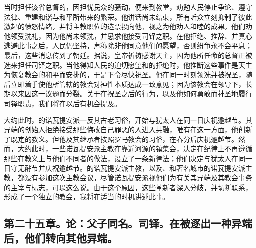 当时担任该省总督的，因担忧民众的骚动，便来到教堂，劝勉人民停止争论、遵守法律、重建和谐与和平所带来的繁荣。他讲话尚未结束，所有听众立刻抑制了彼此激起的愤怒情绪，并将主教职位的选票投向他，视之为他劝人和睦的成果。他们劝他领受洗礼，因为他尚未领洗，并恳求他接受司铎之职。在他拒绝、推辞、并真心逃避此事之后，人民仍坚持，声称除非他同意他们的愿望，否则纷争永不会平息；最后，这些消息传到了朝廷。据说，皇帝祈祷感谢天主，因为他所任命的总督正被选来担任司铎之职。当他得知人民的迫切愿望和的拒绝时，他推断这些事件是天主为恢复教会的和平而安排的，于是下令尽快祝圣。他在同一时刻领洗并被祝圣，随后立即着手使他所管辖的教会对神性本质达成一致意见；因为该教会在领导下，长期以来因这一议题而分裂。关于在祝圣之后的行为，以及他如何勇敢而神圣地履行司铎职责，我们将在以后有机会提及。\par

大约此时，的诺瓦提安派一反其古老习俗，开始与犹太人在同一日庆祝逾越节。其异端的创始人拒绝接受那些悔改自己罪恶的人进入共融，唯有在这一方面，他创新了既定的教义。但他及其继承者按照罗马教会的习俗，在春分后庆祝逾越节。然而，大约此时，一些诺瓦提安派主教在靠近河源的镇集会，决定在纪律上不再遵循那些在教义上与他们不同者的做法，设立了一条新律法；他们决定与犹太人在同一日守无酵节并庆祝逾越节。的诺瓦提安派主教，以及、和著名城市的诺瓦提安派主教，都没有参加这次主教会议，尽管诺瓦提安派视他们为有关其异端及其教会事务的主宰与标志，可以这么说。由于这个原因，这些革新者深入分歧，并切断联系，形成了一个独立的教会，我将在适当的时机讲述此事。\par


\subsection{第二十五章。论：父子同名。司铎。在被逐出一种异端后，他们转向其他异端。}


